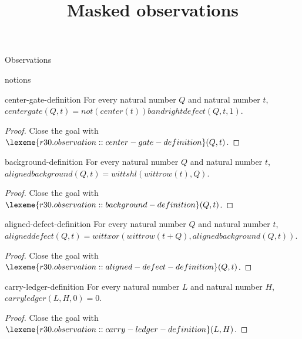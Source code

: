 \begin{lexlean}{Observations}
\title{Masked observations}

\begin{section}{notions}

\begin{lemma}{center-gate-definition}
For every natural number \(Q\) and natural number \(t\), \(centergate(Q, t) = not(center(t)) band rightdefect(Q, t, 1)\).
\begin{proof}
Close the goal with \(\lexeme{r30.observation::center-gate-definition}(Q, t)\).
\end{proof}
\end{lemma}

\begin{lemma}{background-definition}
For every natural number \(Q\) and natural number \(t\), \(alignedbackground(Q, t) = wittshl(wittrow(t), Q)\).
\begin{proof}
Close the goal with \(\lexeme{r30.observation::background-definition}(Q, t)\).
\end{proof}
\end{lemma}

\begin{lemma}{aligned-defect-definition}
For every natural number \(Q\) and natural number \(t\), \(aligneddefect(Q, t) = wittxor(wittrow(t + Q), alignedbackground(Q, t))\).
\begin{proof}
Close the goal with \(\lexeme{r30.observation::aligned-defect-definition}(Q, t)\).
\end{proof}
\end{lemma}

\begin{lemma}{carry-ledger-definition}
For every natural number \(L\) and natural number \(H\), \(carryledger(L, H, 0) = 0\).
\begin{proof}
Close the goal with \(\lexeme{r30.observation::carry-ledger-definition}(L, H)\).
\end{proof}
\end{lemma}


\end{section}
\end{lexlean}
